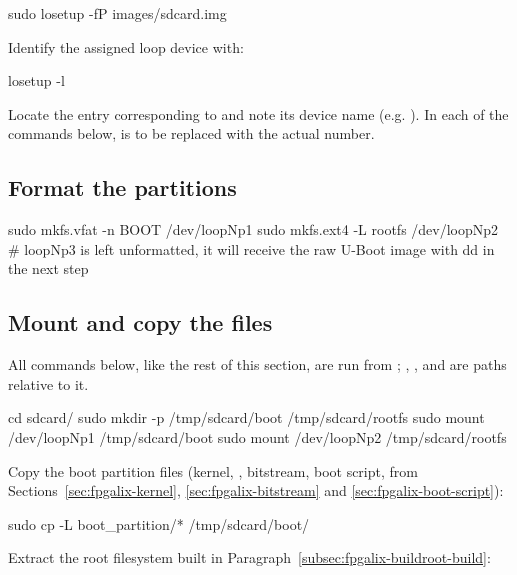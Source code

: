 \begin{shellcodehost}
sudo losetup -fP images/sdcard.img
\end{shellcodehost}

Identify the assigned loop device with:

\begin{shellcodehost}
losetup -l
\end{shellcodehost}

Locate the entry corresponding to  and note its device name (e.g. ). In each of the commands below,  is to be replaced with the actual number.

\subsection{Format the partitions}

\begin{shellcodehost}
sudo mkfs.vfat -n BOOT /dev/loopNp1
sudo mkfs.ext4 -L rootfs /dev/loopNp2
# loopNp3 is left unformatted, it will receive the raw U-Boot image with dd in the next step
\end{shellcodehost}

\subsection{Mount and copy the files}

All commands below, like the rest of this section, are run from ; , ,  and  are paths relative to it.

\begin{shellcodehost}
cd sdcard/
sudo mkdir -p /tmp/sdcard/boot /tmp/sdcard/rootfs
sudo mount /dev/loopNp1 /tmp/sdcard/boot
sudo mount /dev/loopNp2 /tmp/sdcard/rootfs
\end{shellcodehost}

Copy the boot partition files (kernel, , bitstream, boot script, from Sections~\ref{sec:fpgalix-kernel}, \ref{sec:fpgalix-bitstream} and \ref{sec:fpgalix-boot-script}):

\begin{shellcodehost}
sudo cp -L boot_partition/* /tmp/sdcard/boot/
\end{shellcodehost}

Extract the root filesystem built in Paragraph~\ref{subsec:fpgalix-buildroot-build}:

